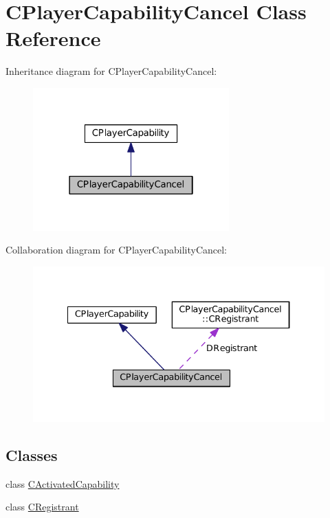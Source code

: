 \hypertarget{classCPlayerCapabilityCancel}{}\section{C\+Player\+Capability\+Cancel Class Reference}
\label{classCPlayerCapabilityCancel}


Inheritance diagram for C\+Player\+Capability\+Cancel\+:
\nopagebreak
\begin{figure}[H]
\begin{center}
\leavevmode
\includegraphics[width=214pt]{classCPlayerCapabilityCancel__inherit__graph}
\end{center}
\end{figure}


Collaboration diagram for C\+Player\+Capability\+Cancel\+:
\nopagebreak
\begin{figure}[H]
\begin{center}
\leavevmode
\includegraphics[width=334pt]{classCPlayerCapabilityCancel__coll__graph}
\end{center}
\end{figure}
\subsection*{Classes}
\begin{DoxyCompactItemize}
\item 
class \hyperlink{classCPlayerCapabilityCancel_1_1CActivatedCapability}{C\+Activated\+Capability}
\item 
class \hyperlink{classCPlayerCapabilityCancel_1_1CRegistrant}{C\+Registrant}
\end{DoxyCompactItemize}
